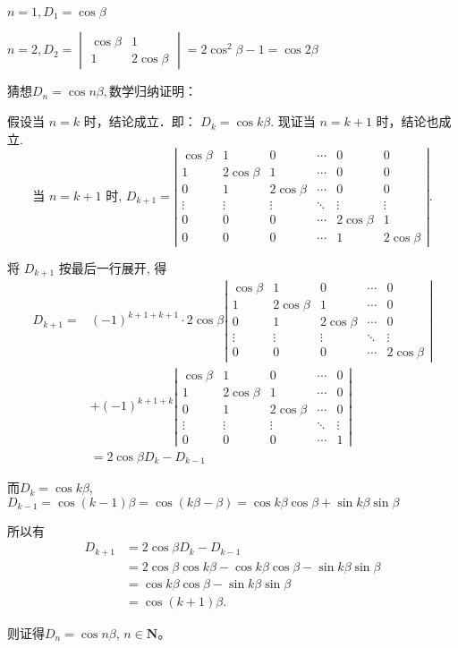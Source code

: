 \begin{solution}
    $n=1,D_1=\cos\beta$

$n=2,D_2=\begin{vmatrix}
\cos\beta&1\\
1&2\cos\beta
\end{vmatrix}=2\cos^2\beta-1=\cos2\beta$

猜想$D_n=\cos n\beta,$数学归纳证明：

假设当 $n=k$ 时，结论成立．即： $D_{k}=\cos k \beta$. 现证当 $n=k+1$ 时，结论也成立.
$$
\text { 当 } n=k+1 \text { 时, } D_{k+1}=\left|\begin{array}{cccccc}
\cos \beta & 1 & 0 & \cdots & 0 & 0 \\
1 & 2 \cos \beta & 1 & \cdots & 0 & 0 \\
0 & 1 & 2 \cos \beta & \cdots & 0 & 0 \\
\vdots & \vdots & \vdots & \ddots & \vdots & \vdots \\
0 & 0 & 0 & \cdots & 2 \cos \beta & 1 \\
0 & 0 & 0 & \cdots & 1 & 2 \cos \beta
\end{array}\right| \text {. }
$$

将 $D_{k+1}$ 按最后一行展开, 得
$$
\begin{aligned}
D_{k+1}=&(-1)^{k+1+k+1} \cdot 2 \cos \beta\left|\begin{array}{ccccc}
\cos \beta & 1 & 0 & \cdots & 0 \\
1 & 2 \cos \beta & 1 & \cdots & 0 \\
0 & 1 & 2 \cos \beta & \cdots & 0 \\
\vdots & \vdots & \vdots & \ddots & \vdots \\
0 & 0 & 0 & \cdots & 2 \cos \beta
\end{array}\right|\\
&+(-1)^{k+1+k}\left|
\begin{array}{ccccc}
\cos \beta & 1 & 0 & \cdots & 0 \\
1 & 2 \cos \beta & 1 & \cdots & 0 \\
0 & 1 & 2 \cos \beta & \cdots & 0 \\
\vdots & \vdots & \vdots & \ddots & \vdots \\
0 & 0 & 0 & \cdots & 1
\end{array}\right|\\
&=2\cos\beta D_k-D_{k-1}
\end{aligned}
$$

而$D_{k}=\cos k \beta$, 
$D_{k-1}=\cos (k-1)\beta
=\cos (k \beta-\beta)
=\cos k \beta \cos \beta+\sin k \beta \sin \beta$

所以有
$$
\begin{aligned}
D_{k+1}&= 2 \cos \beta D_{k}-D_{k-1} \\
&=2 \cos \beta \cos k \beta-\cos k \beta \cos \beta-\sin k \beta \sin \beta \\
&=\cos k \beta \cos \beta-\sin k \beta \sin \beta \\
&=\cos (k+1) \beta .
\end{aligned}
$$

则证得$D_n=\cos n\beta$, $n\in \mathbf{N}$。
\end{solution}

